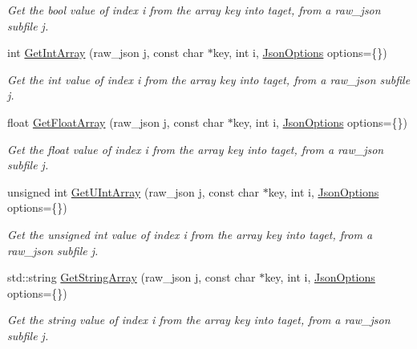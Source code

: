 \begin{DoxyCompactItemize}
\begin{DoxyCompactList}\small\item\em Get the bool value of index {\itshape i} from the array {\itshape key} into {\itshape taget}, from a raw\+\_\+json subfile {\itshape j}. \end{DoxyCompactList}\item 
int \hyperlink{classTarbora_1_1Json_a7f00b9a316dcfa152db52d2128333b7c}{Get\+Int\+Array} (raw\+\_\+json j, const char $\ast$key, int i, \hyperlink{structTarbora_1_1JsonOptions}{Json\+Options} options=\{\})
\begin{DoxyCompactList}\small\item\em Get the int value of index {\itshape i} from the array {\itshape key} into {\itshape taget}, from a raw\+\_\+json subfile {\itshape j}. \end{DoxyCompactList}\item 
float \hyperlink{classTarbora_1_1Json_aae2be9fc9dc68d31de55d1e7fb5354fe}{Get\+Float\+Array} (raw\+\_\+json j, const char $\ast$key, int i, \hyperlink{structTarbora_1_1JsonOptions}{Json\+Options} options=\{\})
\begin{DoxyCompactList}\small\item\em Get the float value of index {\itshape i} from the array {\itshape key} into {\itshape taget}, from a raw\+\_\+json subfile {\itshape j}. \end{DoxyCompactList}\item 
unsigned int \hyperlink{classTarbora_1_1Json_aff4ecfc82b0ca2b07b8f365299dc6b22}{Get\+U\+Int\+Array} (raw\+\_\+json j, const char $\ast$key, int i, \hyperlink{structTarbora_1_1JsonOptions}{Json\+Options} options=\{\})
\begin{DoxyCompactList}\small\item\em Get the unsigned int value of index {\itshape i} from the array {\itshape key} into {\itshape taget}, from a raw\+\_\+json subfile {\itshape j}. \end{DoxyCompactList}\item 
std\+::string \hyperlink{classTarbora_1_1Json_a3c9931f8a801c8e3ac93d645f34aed79}{Get\+String\+Array} (raw\+\_\+json j, const char $\ast$key, int i, \hyperlink{structTarbora_1_1JsonOptions}{Json\+Options} options=\{\})
\begin{DoxyCompactList}\small\item\em Get the string value of index {\itshape i} from the array {\itshape key} into {\itshape taget}, from a raw\+\_\+json subfile {\itshape j}. \end{DoxyCompactList}\end{DoxyCompactItemize}
